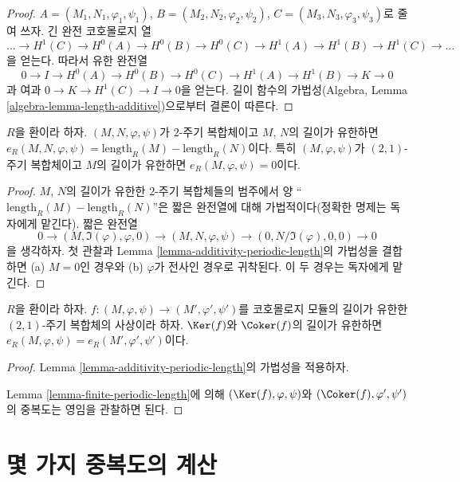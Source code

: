 \begin{proof}
$A = (M_1, N_1, \varphi_1, \psi_1)$,
$B = (M_2, N_2, \varphi_2, \psi_2)$,
$C = (M_3, N_3, \varphi_3, \psi_3)$로 줄여 쓰자. 긴 완전 코호몰로지 열
$$
\ldots
\to H^1(C)
\to H^0(A)
\to H^0(B)
\to H^0(C)
\to H^1(A)
\to H^1(B)
\to H^1(C)
\to \ldots
$$
을 얻는다. 따라서 유한 완전열
$$
0 \to I
\to H^0(A)
\to H^0(B)
\to H^0(C)
\to H^1(A)
\to H^1(B)
\to K \to 0
$$
과 여과 $0 \to K \to H^1(C) \to I \to 0$을 얻는다. 길이 함수의
가법성(Algebra, Lemma \ref{algebra-lemma-length-additive})으로부터
결론이 따른다.
\end{proof}

\begin{lemma}
\label{lemma-finite-periodic-length}
$R$을 환이라 하자. $(M, N, \varphi, \psi)$가 $2$-주기 복합체이고
$M$, $N$의 길이가 유한하면
$e_R(M, N, \varphi, \psi) = \text{length}_R(M) - \text{length}_R(N)$이다.
특히 $(M, \varphi, \psi)$가 $(2, 1)$-주기 복합체이고 $M$의 길이가
유한하면 $e_R(M, \varphi, \psi) = 0$이다.
\end{lemma}

\begin{proof}
$M$, $N$의 길이가 유한한 $2$-주기 복합체들의 범주에서 양
``$\text{length}_R(M) - \text{length}_R(N)$''은 짧은 완전열에 대해
가법적이다(정확한 명제는 독자에게 맡긴다). 짧은 완전열
$$
0 \to (M, \Im(\varphi), \varphi, 0) \to
(M, N, \varphi, \psi) \to (0, N/\Im(\varphi), 0, 0) \to 0
$$
을 생각하자. 첫 관찰과 Lemma
\ref{lemma-additivity-periodic-length}의 가법성을 결합하면
(a) $M = 0$인 경우와 (b) $\varphi$가 전사인 경우로 귀착된다.
이 두 경우는 독자에게 맡긴다.
\end{proof}

\begin{lemma}
\label{lemma-compare-periodic-lengths}
$R$을 환이라 하자. $f : (M, \varphi, \psi) \to (M', \varphi', \psi')$를
코호몰로지 모듈의 길이가 유한한 $(2, 1)$-주기 복합체의 사상이라 하자.
$\Ker(f)$와 $\Coker(f)$의 길이가 유한하면
$e_R(M, \varphi, \psi) = e_R(M', \varphi', \psi')$이다.
\end{lemma}

\begin{proof}
Lemma \ref{lemma-additivity-periodic-length}의 가법성을 적용하자.

Lemma \ref{lemma-finite-periodic-length}에 의해
$(\Ker(f), \varphi, \psi)$와 $(\Coker(f), \varphi', \psi')$의 중복도는
영임을 관찰하면 된다.
\end{proof}




\section{몇 가지 중복도의 계산}
\label{section-calculation}

